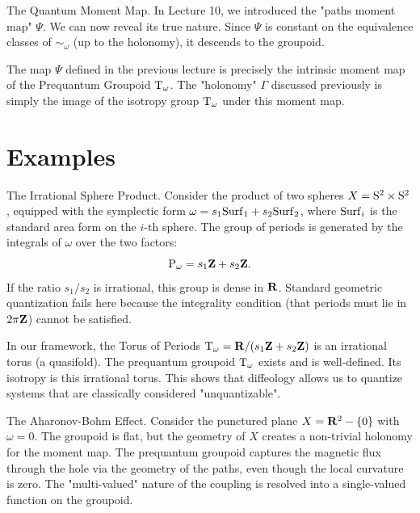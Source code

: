 \begin{Article}{The Quantum Moment Map.}{}
  In Lecture 10,
  we introduced the "paths moment map" $\Psi$.
  We can now reveal its true nature.
  Since $\Psi$ is constant on the equivalence classes of $\sim_\omega$ (up to the holonomy),
  it descends to the groupoid.

  The map $\Psi$ defined in the previous lecture is precisely the intrinsic moment map of the Prequantum Groupoid $\mathrm{T}_\omega$.
  The "holonomy" $\Gamma$ discussed previously is simply the image of the isotropy group $\mathrm{T}_\omega$ under this moment map.
\end{Article}

\section{Examples}

\begin{Article}{The Irrational Sphere Product.}{}
  Consider the product of two spheres $X = \mathrm{S}^2 \times \mathrm{S}^2$,
  equipped with the symplectic form $\omega = s_1 {\operatorname{Surf}}_1 + s_2 {\operatorname{Surf}}_2$,
  where ${\operatorname{Surf}}_i$ is the standard area form on the $i$-th sphere.
  The group of periods is generated by the integrals of $\omega$ over the two factors:
  $$
    \operatorname{P}_\omega = s_1 \mathbf{Z} + s_2 \mathbf{Z}.
  $$
  If the ratio $s_1/s_2$ is irrational,
  this group is dense in $\mathbf{R}$.
  Standard geometric quantization fails here because the integrality condition (that periods must lie in $2\pi\mathbf{Z}$) cannot be satisfied.

  In our framework,
  the Torus of Periods $\mathrm{T}_\omega = \mathbf{R} / (s_1 \mathbf{Z} + s_2 \mathbf{Z})$ is an irrational torus (a quasifold).
  The prequantum groupoid $\mathrm{T}_\omega$ exists and is well-defined.
  Its isotropy is this irrational torus.
  This shows that diffeology allows us to quantize systems that are classically considered "unquantizable".
\end{Article}

\begin{Article}{The Aharonov-Bohm Effect.}{}
  Consider the punctured plane $X = \mathbf{R}^2 - \{0\}$ with $\omega=0$.
  The groupoid is flat,
  but the geometry of $X$ creates a non-trivial holonomy for the moment map.
  The prequantum groupoid captures the magnetic flux through the hole via the geometry of the paths,
  even though the local curvature is zero.
  The "multi-valued" nature of the coupling is resolved into a single-valued function on the groupoid.
\end{Article}

